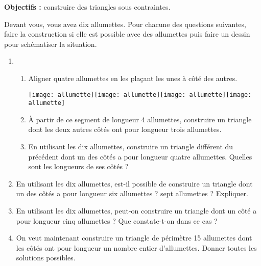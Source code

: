 \begin{activite}
   {\bf Objectifs :} construire des triangles sous contraintes.
   \begin{QCM}
      Devant vous, vous avez dix allumettes. Pour chacune des questions suivantes, faire la construction si elle est possible avec des allumettes puis faire un dessin pour schématiser la situation.
      \begin{enumerate}
         \item
         \begin{enumerate}
            \item Aligner quatre allumettes en les plaçant les unes à côté des autres.
            \bigskip
            \begin{center}
               \texttt{[image: allumette]}\texttt{[image: allumette]}\texttt{[image: allumette]}\texttt{[image: allumette]}
            \end{center}
            \bigskip
            \item À partir de ce segment de longueur 4 allumettes, construire un triangle dont les deux autres côtés ont pour longueur trois allumettes. \\ [2cm]
            \item En utilisant les dix allumettes, construire un triangle différent du précédent dont un des côtés a pour longueur quatre allumettes. Quelles sont les longueurs de ses côtés ? \\ [2cm]
         \end{enumerate}
         \item En utilisant les dix allumettes, est-il possible de construire un triangle dont un des côtés a pour longueur six allumettes ? sept allumettes ? Expliquer. \\ [2cm]
         \item En utilisant les dix allumettes, peut-on construire un triangle dont un côté a pour longueur cinq allumettes ? Que constate-t-on dans ce cas ? \\ [2cm]
         \item On veut maintenant construire un triangle de périmètre 15 allumettes dont les côtés ont pour longueur un nombre entier d'allumettes. Donner toutes les solutions possibles. \\ [2cm]
      \end{enumerate}
   \end{QCM}
\end{activite}


